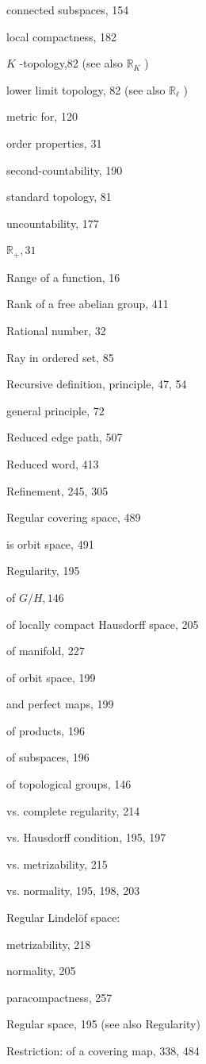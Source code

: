 connected subspaces, 154

local compactness, 182

\(K\) -topology,82 (see also \({\mathbb{R}}_{K}\) )

lower limit topology, 82 (see also \({\mathbb{R}}_{\ell }\) )

metric for, 120

order properties, 31

second-countability, 190

standard topology, 81

uncountability, 177

\({\mathbb{R}}_{ + },{31}\)

Range of a function, 16

Rank of a free abelian group, 411

Rational number, 32

Ray in ordered set, 85

Recursive definition, principle, 47, 54

general principle, 72

Reduced edge path, 507

Reduced word, 413

Refinement, 245, 305

Regular covering space, 489

is orbit space, 491

Regularity, 195

of \(G/H,{146}\)

of locally compact Hausdorff space, 205

of manifold, 227

of orbit space, 199

and perfect maps, 199

of products, 196

of subspaces, 196

of topological groups, 146

vs. complete regularity, 214

vs. Hausdorff condition, 195, 197

vs. metrizability, 215

vs. normality, 195, 198, 203

Regular Lindelöf space:

metrizability, 218

normality, 205

paracompactness, 257

Regular space, 195 (see also Regularity)

Restriction: of a covering map, 338, 484

